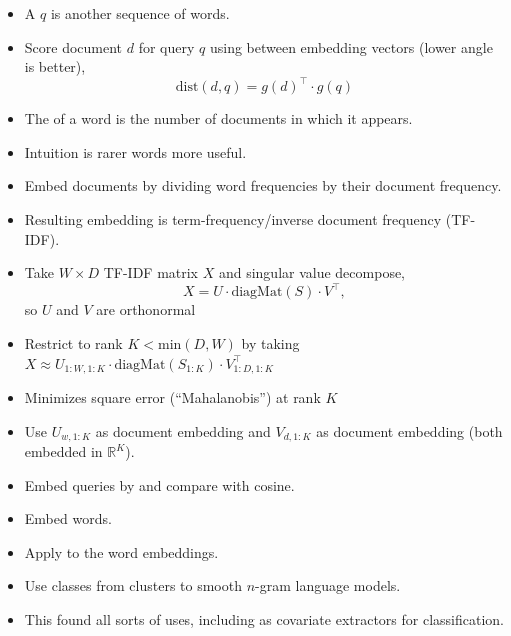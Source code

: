 \documentclass[10pt]{report}
\begin{document}
\begin{itemize}
\item A  $q$ is another sequence of words.
\item Score document $d$ for query $q$ using 
  between embedding vectors (lower angle is better),
  $$
  \textrm{dist}(d, q) = g(d)^{\top} \cdot g(q)
  $$
\end{itemize}
\vfill
{}

\begin{itemize}
\item The  of a word is the number of
  documents in which it appears.
\item Intuition is rarer words more useful.
\item Embed documents by dividing word frequencies by their document
  frequency.
\item Resulting embedding is term-frequency/inverse document frequency
  (TF-IDF). 
\end{itemize}
\vfill
{}

\begin{itemize}
\item Take $W \times D$ TF-IDF matrix $X$ and singular value decompose,
  $$
  X = U \cdot \textrm{diagMat}(S) \cdot V^{\top},
  $$
  so $U$ and $V$ are orthonormal
\item Restrict to rank $K < \textrm{min}(D, W)$ by taking
  $X \approx U_{1:W,1:K} \cdot \textrm{diagMat}(S_{1:K}) \cdot V_{1:D,
    1:K}^{\top}$
\item Minimizes square error (``Mahalanobis'') at rank $K$
\item Use $U_{w,1:K}$ as document embedding and $V_{d,1:K}$ as
  document embedding (both embedded in $\mathbb{R}^K$).
\item Embed queries by  and compare with cosine. 
\end{itemize}
\vfill
{}

\begin{itemize}
\item Embed words.
\item Apply  to the word embeddings.
\item Use classes from clusters to smooth $n$-gram language models.
\item This found all sorts of uses, including as covariate extractors
  for classification.
\end{itemize}
\vfill
{}
\end{document}
